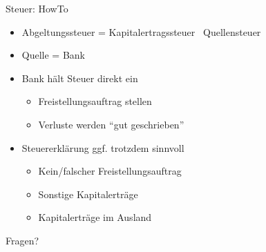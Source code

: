 \documentclass{beamer}
\begin{document}
		\begin{frame}{Steuer: HowTo}
			\begin{itemize}
				\item Abgeltungssteuer = Kapitalertragssteuer \textrightarrow\ Quellensteuer
				\item Quelle = Bank\pause
				\item Bank hält Steuer direkt ein
				\begin{itemize}
					\item Freistellungsauftrag stellen
					\item Verluste werden "`gut geschrieben"'
				\end{itemize}\pause
				\item Steuererklärung ggf. trotzdem sinnvoll
				\begin{itemize}
					\item Kein/falscher Freistellungsauftrag
					\item Sonstige Kapitalerträge
					\item Kapitalerträge im Ausland
				\end{itemize}
			\end{itemize}
		\end{frame}
	
	{
		\begin{frame}[plain]
			\begin{center}
				\vspace{1.5cm}
				Fragen?
			\end{center}
		\end{frame}
	}
\end{document}
